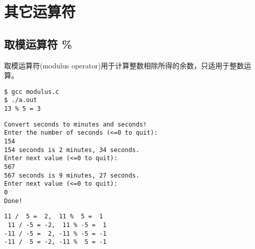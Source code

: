 \section{其它运算符}

\subsection{取模运算符 {\tf \%}}
\begin{frame}[fragile]
取模运算符(modulus operator)用于计算整数相除所得的余数，\textcolor{acolor1}{只适用于整数运算}。

\end{frame}

\begin{frame}[fragile]


\begin{lstlisting}[backgroundcolor=\color{red!10}]
$ gcc modulus.c
$ ./a.out  
13 % 5 = 3
\end{lstlisting}
\end{frame}

\begin{frame}

\end{frame}


\begin{frame}[fragile]
\begin{lstlisting}[backgroundcolor=\color{red!10}]
Convert seconds to minutes and seconds!
Enter the number of seconds (<=0 to quit):
154
154 seconds is 2 minutes, 34 seconds.
Enter next value (<=0 to quit):
567
567 seconds is 9 minutes, 27 seconds.
Enter next value (<=0 to quit):
0
Done!
\end{lstlisting}
\end{frame}

\begin{frame}


\end{frame}

\begin{frame}[fragile]
\begin{lstlisting}[backgroundcolor=\color{red!10}]
 11 /  5 =  2,  11 %  5 =  1
 11 / -5 = -2,  11 % -5 =  1
-11 / -5 =  2, -11 % -5 = -1
-11 /  5 = -2, -11 %  5 = -1
\end{lstlisting}
\end{frame}

